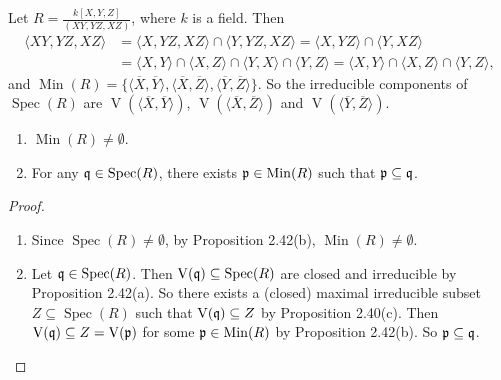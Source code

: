 \begin{example}
    Let $R = \frac{k[X,Y,Z]}{(XY,YZ,XZ)}$, where $k$ is a field. Then 
    \begin{align*}
        \langle XY,YZ,XZ \rangle &= \langle X,YZ,XZ \rangle \cap \langle Y,YZ,XZ \rangle = \langle X,YZ \rangle \cap \langle Y,XZ \rangle \\
        &= \langle X,Y \rangle \cap \langle X,Z \rangle \cap \langle Y,X \rangle \cap \langle Y,Z \rangle = \langle X,Y \rangle \cap \langle X,Z \rangle \cap \langle Y,Z \rangle,
    \end{align*}
    and $\operatorname{Min}(R) = \{\langle \overbar X,\overbar Y \rangle, \langle \overbar X,\overbar Z \rangle, \langle \overbar Y, \overbar Z \rangle\}$. So the irreducible components of $\operatorname{Spec}(R)$ are $\operatorname{V}(\langle \overbar X,\overbar Y \rangle)$, $\operatorname{V}(\langle \overbar X, \overbar Z \rangle)$ and $\operatorname{V}(\langle \overbar Y,\overbar Z \rangle)$.
\end{example}

\begin{corollary}
    \begin{enumerate}
        \item $\operatorname{Min}(R) \neq \emptyset$.
        \item For any $\mathfrak{q} \in \operatorname{Spec}(R)$, there exists $\mathfrak{p} \in \operatorname{Min}(R)$ such that $\mathfrak{p} \subseteq \mathfrak{q}$.
    \end{enumerate}
\end{corollary}

\begin{proof}
    \begin{enumerate}
        \item Since $\operatorname{Spec}(R) \neq \emptyset$, by Proposition 2.42(b), $\operatorname{Min}(R) \neq \emptyset$.
        \item Let $\mathfrak{q} \in \operatorname{Spec}(R)$. Then $\operatorname{V}(\mathfrak{q}) \subseteq \operatorname{Spec}(R)$ are closed and irreducible by Proposition 2.42(a). So there exists a (closed) maximal irreducible subset $Z \subseteq \operatorname{Spec}(R)$ such that $\operatorname{V}(\mathfrak{q}) \subseteq Z$ by Proposition 2.40(c). Then $\operatorname{V}(\mathfrak{q}) \subseteq Z = \operatorname{V}(\mathfrak{p})$ for some $\mathfrak{p} \in \operatorname{Min}(R)$ by Proposition 2.42(b). So $\mathfrak{p} \subseteq \mathfrak{q}$. \qedhere
    \end{enumerate}
\end{proof}

